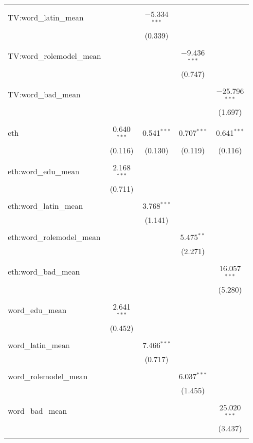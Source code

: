 \begin{table}[!htbp]
\begin{tabular}{@{\extracolsep{-2pt}}lcccc}
  & & & & \\ 
 TV:word\_latin\_mean &  & $-$5.334$^{***}$ &  &  \\ 
  &  & (0.339) &  &  \\ 
  & & & & \\ 
 TV:word\_rolemodel\_mean &  &  & $-$9.436$^{***}$ &  \\ 
  &  &  & (0.747) &  \\ 
  & & & & \\ 
 TV:word\_bad\_mean &  &  &  & $-$25.796$^{***}$ \\ 
  &  &  &  & (1.697) \\ 
  & & & & \\ 
 eth & 0.640$^{***}$ & 0.541$^{***}$ & 0.707$^{***}$ & 0.641$^{***}$ \\ 
  & (0.116) & (0.130) & (0.119) & (0.116) \\ 
  & & & & \\ 
 eth:word\_edu\_mean & 2.168$^{***}$ &  &  &  \\ 
  & (0.711) &  &  &  \\ 
  & & & & \\ 
 eth:word\_latin\_mean &  & 3.768$^{***}$ &  &  \\ 
  &  & (1.141) &  &  \\ 
  & & & & \\ 
 eth:word\_rolemodel\_mean &  &  & 5.475$^{**}$ &  \\ 
  &  &  & (2.271) &  \\ 
  & & & & \\ 
 eth:word\_bad\_mean &  &  &  & 16.057$^{***}$ \\ 
  &  &  &  & (5.280) \\ 
  & & & & \\ 
 word\_edu\_mean & 2.641$^{***}$ &  &  &  \\ 
  & (0.452) &  &  &  \\ 
  & & & & \\ 
 word\_latin\_mean &  & 7.466$^{***}$ &  &  \\ 
  &  & (0.717) &  &  \\ 
  & & & & \\ 
 word\_rolemodel\_mean &  &  & 6.037$^{***}$ &  \\ 
  &  &  & (1.455) &  \\ 
  & & & & \\ 
 word\_bad\_mean &  &  &  & 25.020$^{***}$ \\ 
  &  &  &  & (3.437) \\ 
  & & & & \\ 

\end{tabular}
\end{table}
